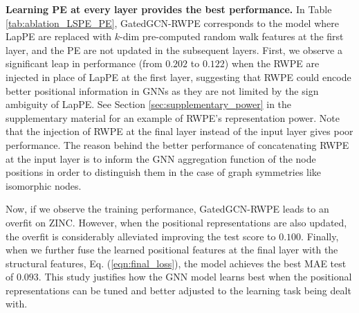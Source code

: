 \documentclass{article} \usepackage{iclr2021_conference,times}
\begin{document}
{\bf Learning PE at every layer provides the best performance.} In Table \ref{tab:ablation_LSPE_PE}, GatedGCN-RWPE corresponds to the model where LapPE are replaced with $k$-dim pre-computed random walk features at the first layer, and the PE are not updated in the subsequent layers. First, we observe a significant leap in performance (from $0.202$ to $0.122$) when the RWPE are injected in place of LapPE at the first layer, suggesting that RWPE could encode better positional information in GNNs as they are not limited by the sign ambiguity of LapPE. See Section \ref{sec:supplementary_power} in the supplementary material for an example of RWPE's representation power. Note that the injection of RWPE at the final layer instead of the input layer gives poor performance. The reason behind the better performance of concatenating RWPE at the input layer is to inform the GNN aggregation function of the node positions in order to distinguish them in the case of graph symmetries like isomorphic nodes.

Now, if we observe the training performance, GatedGCN-RWPE leads to an overfit on ZINC. However, when the positional representations are also updated, the overfit is considerably alleviated improving the test score to $0.100$. Finally, when we further fuse the learned positional features at the final layer with the structural features, Eq. (\ref{eqn:final_loss}), the model achieves the best  MAE test of $0.093$. This study justifies how the GNN model learns best when the positional representations can be tuned and better adjusted to the learning task being dealt with. 
\end{document}

